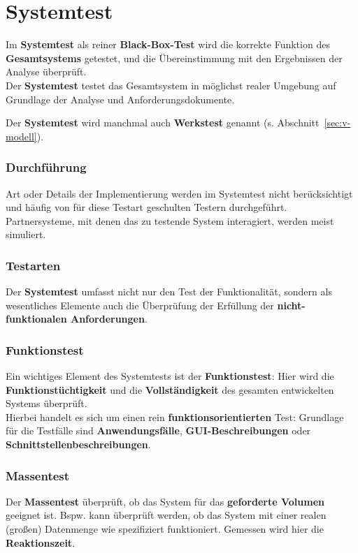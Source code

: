 \section{Systemtest}

\begin{tcolorbox}[title=Systemtest]
    Im \textbf{Systemtest} als reiner \textbf{Black-Box-Test} wird die korrekte Funktion des \textbf{Gesamtsystems} getestet, und die Übereinstimmung mit den Ergebnissen der Analyse überprüft.\\
    Der \textbf{Systemtest} testet das Gesamtsystem in möglichst realer Umgebung auf Grundlage der Analyse und Anforderungsdokumente.
\end{tcolorbox}

\noindent
Der \textbf{Systemtest} wird manchmal auch \textbf{Werkstest} genannt (s. Abschnitt~\ref{sec:v-modell}).

\subsubsection*{Durchführung}
Art oder Details der Implementierung werden im Systemtest nicht berücksichtigt und häufig von für diese Testart geschulten Testern durchgeführt. Partnersysteme, mit denen das zu testende System interagiert, werden meist simuliert.

\subsubsection*{Testarten}
Der \textbf{Systemtest} umfasst nicht nur den Test der Funktionalität, sondern als wesentliches Elemente auch die Überprüfung der Erfüllung der \textbf{nicht-funktionalen Anforderungen}.

\subsubsection*{Funktionstest}
Ein wichtiges Element des Systemtests ist der \textbf{Funktionstest}: Hier wird die \textbf{Funktionstüchtigkeit} und die \textbf{Vollständigkeit} des gesamten entwickelten Systems überprüft.\\
Hierbei handelt es sich um einen rein \textbf{funktionsorientierten} Test: Grundlage für die Testfälle sind \textbf{Anwendungsfälle}, \textbf{GUI-Beschreibungen} oder \textbf{Schnittstellenbeschreibungen}.

\subsubsection*{Massentest}
Der \textbf{Massentest} überprüft, ob das System für das \textbf{geforderte Volumen} geeignet ist.
Bspw. kann überprüft werden, ob das System mit einer realen (großen) Datenmenge wie spezifiziert funktioniert.
Gemessen wird hier die \textbf{Reaktionszeit}.

